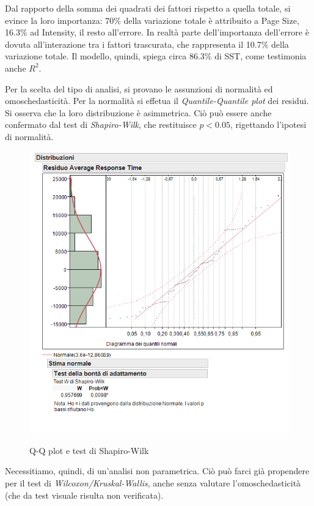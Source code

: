 		Dal rapporto della somma dei quadrati dei fattori rispetto a quella totale, si evince la loro importanza: 70\% della variazione totale è attribuito a Page Size, 16.3\% ad Intensity, il resto all'errore. In realtà parte dell'importanza dell'errore è dovuta all'interazione tra i fattori trascurata, che rappresenta il 10.7\% della variazione totale. Il modello, quindi, spiega circa 86.3\% di SST, come testimonia anche $R^2$.\par
		Per la scelta del tipo di analisi, si provano le assunzioni di normalità ed omoschedasticità. Per la normalità si effetua il \emph{Quantile-Quantile plot} dei residui. Si osserva che la loro distribuzione è asimmetrica. Ciò può essere anche confermato dal test di \emph{Shapiro-Wilk}, che restituisce $p<0.05$, rigettando l'ipotesi di normalità.
		
		\begin{figure}[H]
			\centering
			\includegraphics{./immagine/Distribuzione.png}
			\label{fig:doe-n}
			\caption{Q-Q plot e test di Shapiro-Wilk}
		\end{figure}
	
		Necessitiamo, quindi, di un'analisi non parametrica. Ciò può farci già propendere per il test di \emph{Wilcoxon/Kruskal-Wallis}, anche senza valutare l'omoschedasticità (che da test visuale risulta non verificata).
		
